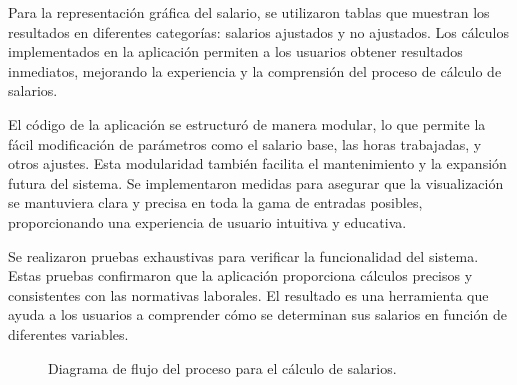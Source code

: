 \documentclass[conference]{IEEEtran}
\begin{document}
Para la representación gráfica del salario, se utilizaron tablas\cite{anatohipervisor7} que muestran los resultados en diferentes categorías: salarios ajustados y no ajustados. Los cálculos implementados en la aplicación permiten a los usuarios obtener resultados inmediatos\cite{anatohipervisor8}, mejorando la experiencia y la comprensión del proceso de cálculo de salarios.

El código de la aplicación se estructuró de manera modular\cite{anatohipervisor9}, lo que permite la fácil modificación de parámetros como el salario base, las horas trabajadas, y otros ajustes. Esta modularidad también facilita el mantenimiento y la expansión futura del sistema. Se implementaron medidas para asegurar que la visualización\cite{anatohipervisor10} se mantuviera clara y precisa en toda la gama de entradas posibles, proporcionando una experiencia de usuario intuitiva y educativa.

Se realizaron pruebas exhaustivas para verificar la funcionalidad del sistema. Estas pruebas confirmaron que la aplicación proporciona cálculos precisos y consistentes con las normativas laborales. El resultado es una herramienta que ayuda a los usuarios a comprender cómo se determinan sus salarios en función de diferentes variables.

\begin{figure}[h]
\centering
{}
\caption{Diagrama de flujo del proceso para el cálculo de salarios.}
\label{fig:diagrama_flujo}
\end{figure}
\end{document}
